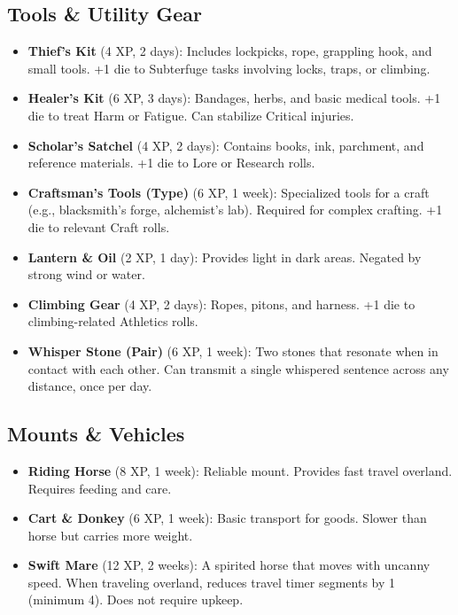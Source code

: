 \documentclass[12pt]{article}
\begin{document}
\subsection*{Tools \& Utility Gear}

\begin{itemize}[leftmargin=*]
  \item \textbf{Thief's Kit} (4 XP, 2 days): Includes lockpicks, rope, grappling hook, and small tools. +1 die to Subterfuge tasks involving locks, traps, or climbing.
  \item \textbf{Healer's Kit} (6 XP, 3 days): Bandages, herbs, and basic medical tools. +1 die to treat Harm or Fatigue. Can stabilize Critical injuries.
  \item \textbf{Scholar's Satchel} (4 XP, 2 days): Contains books, ink, parchment, and reference materials. +1 die to Lore or Research rolls.
  \item \textbf{Craftsman's Tools (Type)} (6 XP, 1 week): Specialized tools for a craft (e.g., blacksmith's forge, alchemist's lab). Required for complex crafting. +1 die to relevant Craft rolls.
  \item \textbf{Lantern \& Oil} (2 XP, 1 day): Provides light in dark areas. Negated by strong wind or water.
  \item \textbf{Climbing Gear} (4 XP, 2 days): Ropes, pitons, and harness. +1 die to climbing-related Athletics rolls.
  \item \textbf{Whisper Stone (Pair)} (6 XP, 1 week): Two stones that resonate when in contact with each other. Can transmit a single whispered sentence across any distance, once per day.
\end{itemize}

\subsection*{Mounts \& Vehicles}

\begin{itemize}[leftmargin=*]
  \item \textbf{Riding Horse} (8 XP, 1 week): Reliable mount. Provides fast travel overland. Requires feeding and care.
  \item \textbf{Cart \& Donkey} (6 XP, 1 week): Basic transport for goods. Slower than horse but carries more weight.
  \item \textbf{Swift Mare} (12 XP, 2 weeks): A spirited horse that moves with uncanny speed. When traveling overland, reduces travel timer segments by 1 (minimum 4). Does not require upkeep.
\end{itemize}
\end{document}
